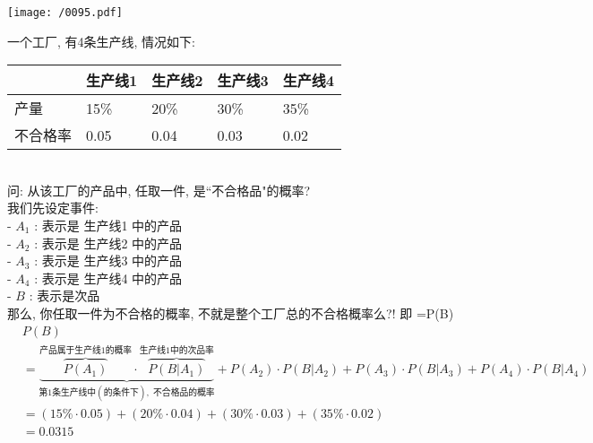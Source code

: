 \documentclass[UTF8]{ctexart}
\begin{document}
	\texttt{[image: /0095.pdf]}
	
	
	\begin{myEnvSample}
		一个工厂, 有4条生产线, 情况如下: \\	
		\begin{tabular}{|l| l| l| l| l|}
			\hline
		 	&  生产线1  & 生产线2  &  生产线3 & 生产线4 \\
			\hline
			产量 &  15\% & 20\% & 30\% & 35\% \\
			\hline
			不合格率 &  0.05 & 0.04 & 0.03 & 0.02 \\
			\hline
		\end{tabular} \\
	
	问: 从该工厂的产品中, 任取一件, 是``不合格品"的概率? \\
	
	我们先设定事件: \\
	- $A_1$ : 表示是 生产线1 中的产品 \\
	- $A_2$ : 表示是 生产线2 中的产品 \\
	- $A_3$ : 表示是 生产线3 中的产品 \\
	- $A_4$ : 表示是 生产线4 中的产品 \\
	- $B$ : 表示是次品 \\
	
	那么, 你任取一件为不合格的概率, 不就是整个工厂总的不合格概率么?! 即 =P(B) \\		
		\begin{align*}
	&P\left( B \right)\\
&=\underset{\text{第1条生产线中}\left( \text{的条件下} \right) ,\,\,\text{不合格品的概率}}{\underbrace{\overset{\text{产品属于生产线1的概率}}{\overbrace{P\left( A_1 \right) }}\cdot \overset{\text{生产线1中的次品率}}{\overbrace{P\left( B|A_1 \right) }}}}+P\left( A_2 \right) \cdot P\left( B|A_2 \right) +P\left( A_3 \right) \cdot P\left( B|A_3 \right) +P\left( A_4 \right) \cdot P\left( B|A_4 \right)\\
&=(15\%\cdot 0.05)+(20\%\cdot 0.04)+(30\%\cdot 0.03)+(35\%\cdot 0.02)\\
&=0.0315
		\end{align*}
	\end{myEnvSample}
\end{document}
